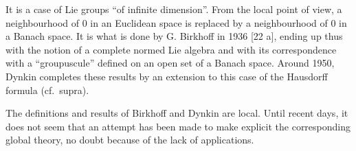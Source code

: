 It is a case of Lie groups ``of infinite dimension''. From the local point of view, a neighbourhood of 0 in an Euclidean space is replaced by a neighbourhood of 0 in a Banach space. It is what is done by G. Birkhoff in 1936 {[}22 a{]}, ending up thus with the notion of a complete normed Lie algebra and with its correspondence with a ``groupuscule'' defined on an open set of a Banach space. Around 1950, Dynkin completes these results by an extension to this case of the Hausdorff formula (cf.~supra).

The definitions and results of Birkhoff and Dynkin are local. Until recent days, it does not seem that an attempt has been made to make explicit the corresponding global theory, no doubt because of the lack of applications.

